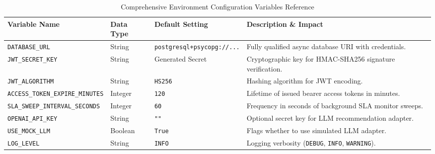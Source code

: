 \documentclass[11pt,a4paper,oneside]{report}
\begin{document}
\begin{table}[H]
\centering
\small
\caption{Comprehensive Environment Configuration Variables Reference}
\label{tab:app_env_vars}
\begin{tabular}{p{5.0cm}p{2.0cm}p{3.5cm}p{4.5cm}}
\toprule
\textbf{Variable Name} & \textbf{Data Type} & \textbf{Default Setting} & \textbf{Description \& Impact} \\
\midrule
\texttt{DATABASE\_URL} & String & \texttt{postgresql+psycopg://...} & Fully qualified async database URI with credentials. \\
\addlinespace
\texttt{JWT\_SECRET\_KEY} & String & Generated Secret & Cryptographic key for HMAC-SHA256 signature verification. \\
\addlinespace
\texttt{JWT\_ALGORITHM} & String & \texttt{HS256} & Hashing algorithm for JWT encoding. \\
\addlinespace
\texttt{ACCESS\_TOKEN\_EXPIRE\_MINUTES}& Integer & \texttt{120} & Lifetime of issued bearer access tokens in minutes. \\
\addlinespace
\texttt{SLA\_SWEEP\_INTERVAL\_SECONDS} & Integer & \texttt{60} & Frequency in seconds of background SLA monitor sweeps. \\
\addlinespace
\texttt{OPENAI\_API\_KEY} & String & \texttt{""} & Optional secret key for LLM recommendation adapter. \\
\addlinespace
\texttt{USE\_MOCK\_LLM} & Boolean & \texttt{True} & Flags whether to use simulated LLM adapter. \\
\addlinespace
\texttt{LOG\_LEVEL} & String & \texttt{INFO} & Logging verbosity (\texttt{DEBUG}, \texttt{INFO}, \texttt{WARNING}). \\
\bottomrule
\end{tabular}
\end{table}
\end{document}
